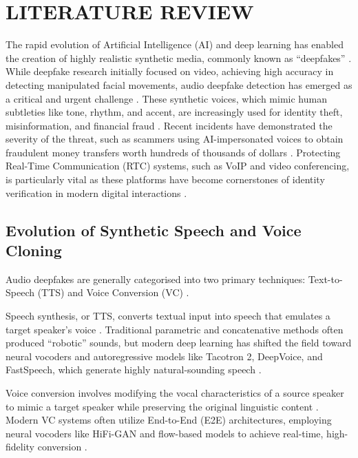 \newpage
\section{LITERATURE REVIEW}

The rapid evolution of Artificial Intelligence (AI) and deep learning has enabled the creation of highly realistic synthetic media, commonly known as ``deepfakes'' \cite{Reddy2025, Raza2026}. While deepfake research initially focused on video, achieving high accuracy in detecting manipulated facial movements, audio deepfake detection has emerged as a critical and urgent challenge \cite{Reddy2025, Yamagishi2021}. These synthetic voices, which mimic human subtleties like tone, rhythm, and accent, are increasingly used for identity theft, misinformation, and financial fraud \cite{Reddy2025, Li2024_survey}. Recent incidents have demonstrated the severity of the threat, such as scammers using AI-impersonated voices to obtain fraudulent money transfers worth hundreds of thousands of dollars \cite{Pianese2022, Mathew2024, Xue2025_RTCFake}. Protecting Real-Time Communication (RTC) systems, such as VoIP and video conferencing, is particularly vital as these platforms have become cornerstones of identity verification in modern digital interactions \cite{Mathew2024, Wang2024_asv5}.

\subsection{Evolution of Synthetic Speech and Voice Cloning}

Audio deepfakes are generally categorised into two primary techniques: Text-to-Speech (TTS) and Voice Conversion (VC) \cite{Li2024_survey, Azzuni2024}.

Speech synthesis, or TTS, converts textual input into speech that emulates a target speaker's voice \cite{Reddy2025, Li2024_survey}. Traditional parametric and concatenative methods often produced ``robotic'' sounds, but modern deep learning has shifted the field toward neural vocoders and autoregressive models like Tacotron 2, DeepVoice, and FastSpeech, which generate highly natural-sounding speech \cite{Azzuni2024, ZhangB2025}.

Voice conversion involves modifying the vocal characteristics of a source speaker to mimic a target speaker while preserving the original linguistic content \cite{Li2024_survey, Azzuni2024}. Modern VC systems often utilize End-to-End (E2E) architectures, employing neural vocoders like HiFi-GAN and flow-based models to achieve real-time, high-fidelity conversion \cite{Azzuni2024, Bird2023}.

